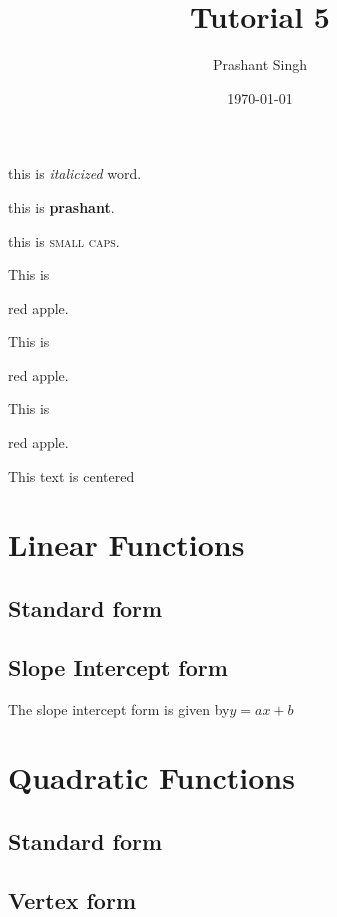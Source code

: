 \documentclass[11pt]{article}
\begin{document}
\tableofcontents
	\title{Tutorial 5}
	\author{Prashant Singh}
	\date{\today}
	\maketitle
	this is \textit{italicized} word.
	
	this is \textbf{prashant}.
	
	this is \textsc{small caps}.
	
	This is \begin{Large}red apple.\end{Large}
	
	This is \begin{huge}red apple.\end{huge}
	
	This is \begin{Huge}red apple.\end{Huge}
	
	\begin{center} This text is centered \end{center}
	
	\section{Linear Functions}
		\subsection{Standard form}
		\subsection{Slope Intercept form}
		The slope intercept form is given by$y = ax + b$
	\section{Quadratic Functions}
		\subsection{Standard form}
		\subsection{Vertex form}
\end{document}
